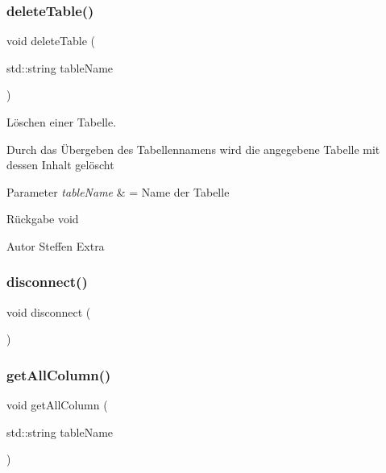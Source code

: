 \mbox{\label{sqllib_8hpp_a9754762b2c19711bf3dcbfceca61d97d}} 
\subsubsection{delete\+Table()}
{\footnotesize\ttfamily void delete\+Table (\begin{DoxyParamCaption}\item[{std\+::string}]{table\+Name }\end{DoxyParamCaption})}



Löschen einer Tabelle. 

Durch das Übergeben des Tabellennamens wird die angegebene Tabelle mit dessen Inhalt gelöscht


\begin{DoxyParams}{Parameter}
{\em table\+Name} & = Name der Tabelle\\
\hline
\end{DoxyParams}
\begin{DoxyReturn}{Rückgabe}
void
\end{DoxyReturn}
\begin{DoxyAuthor}{Autor}
Steffen Extra 
\end{DoxyAuthor}
\mbox{\label{sqllib_8hpp_a960705de531a20389fb29928d43258c3}} 
\subsubsection{disconnect()}
{\footnotesize\ttfamily void disconnect (\begin{DoxyParamCaption}{ }\end{DoxyParamCaption})}

\mbox{\label{sqllib_8hpp_aceb780082d3f7392e485cac394d6c606}} 
\subsubsection{get\+All\+Column()}
{\footnotesize\ttfamily void get\+All\+Column (\begin{DoxyParamCaption}\item[{std\+::string}]{table\+Name }\end{DoxyParamCaption})}


